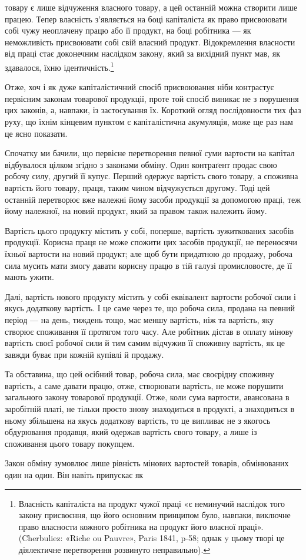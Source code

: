 \parcont{}  %
товару є лише відчуження власного товару, а цей останній можна
створити лише працею. Тепер власність з’являється на боці
капіталіста як право присвоювати собі чужу неоплачену працю
або її продукт, на боці робітника — як неможливість присвоювати
собі свій власний продукт. Відокремлення власности від
праці стає доконечним наслідком закону, який за вихідний пункт
мав, як здавалося, їхню ідентичність.\footnote{
Власність капіталіста на продукт чужої праці «є неминучий
наслідок того закону присвоєння, що його основним принципом було,
навпаки, виключне право власности кожного робітника на продукт його
власної праці». (Cherbuliez: «Riche ou Pauvre», Paris 1841, p-58; однак
y цьому творі це діялектичне перетворення розвинуто неправильно).
}

Отже, хоч і як дуже капіталістичний спосіб присвоювання
ніби контрастує первісним законам товарової продукції, проте
той спосіб виникає не з порушення цих законів, а, навпаки, із застосування
їх. Короткий огляд послідовности тих фаз руху, що
їхнім кінцевим пунктом є капіталістична акумуляція, може ще
раз нам це ясно показати.

Спочатку ми бачили, що первісне перетворення певної суми
вартости на капітал відбувалося цілком згідно з законами обміну.
Один контраґент продає свою робочу силу, другий її купує.
Перший одержує вартість свого товару, а споживна вартість
його товару, праця, таким чином відчужується другому. Тоді
цей останній перетворює вже належні йому засоби продукції
за допомогою праці, теж йому належної, на новий продукт, який
за правом також належить йому.

Вартість цього продукту містить у собі, поперше, вартість
зужиткованих засобів продукції. Корисна праця не може спожити
цих засобів продукції, не переносячи їхньої вартости на
новий продукт; але щоб бути придатною до продажу, робоча
сила мусить мати змогу давати корисну працю в тій галузі промисловосте,
де її мають ужити.

Далі, вартість нового продукту містить у собі еквівалент
вартости робочої сили і якусь додаткову вартість. І це саме через
те, що робоча сила, продана на певний період — на день, тиждень
тощо, має меншу вартість, ніж та вартість, яку створює споживання
її протягом того часу. Але робітник дістав в оплату мінову
вартість своєї робочої сили й тим самим відчужив її споживну
вартість, як це завжди буває при кожній купівлі й продажу.

Та обставина, що цей осібний товар, робоча сила, має своєрідну
споживну вартість, а саме давати працю, отже, створювати
вартість, не може порушити загального закону товарової продукції.
Отже, коли сума вартости, авансована в заробітній платі, не
тільки просто знову знаходиться в продукті, а знаходиться в
ньому збільшена на якусь додаткову вартість, то це випливає
не з якогось обдурювання продавця, який одержав вартість
свого товару, а лише із споживання цього товару покупцем.

Закон обміну зумовлює лише рівність мінових вартостей
товарів, обмінюваних один на один. Він навіть припускає як
\parbreak{}  %
